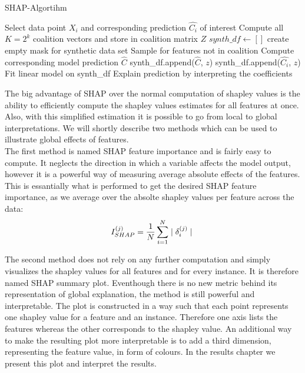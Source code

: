 \documentclass[12pt,titlepage]{article}
\begin{document}
\begin{algorithm}
\caption{SHAP-Algortihm}\label{alg:shap}
\begin{algorithmic}
    \State Select data point $X_{i}$ and corresponding prediction $\hat{C_{i}}$ of interest
    \State Compute all $K = 2^k$ coalition vectors and store in coalition matrix $Z$
    \State $synth\_df \gets []$ create empty mask for synthetic data set
                \State Sample for features not in coalition
                \State Compute corresponding model prediction $\hat{C}$
                \State synth\_df.append($\hat{C}$, $z$)
            \EndFor
        \Else
            \State synth\_df.append($\hat{C_{i}}$, $z$)
        \EndIf
    \EndFor
    \State Fit linear model on synth\_df
    \State Explain prediction by interpreting the coefficients
\end{algorithmic}
\end{algorithm}

The big advantage of SHAP over the normal computation of shapley values is the ability to efficiently compute the shapley values estimates for all features at once. Also, with this simplified estimation it is possible to go from local to global interpretations. We will shortly describe two methods which can be used to illustrate global effects of features. \\
The first method is named SHAP feature importance and is fairly easy to compute. It neglects the direction in which a variable affects the model output, however it is a powerful way of measuring average absolute effects of the features. This is essantially what is performed to get the desired SHAP feature importance, as we average over the absolte shapley values per feature across the data: \\

\begin{equation} \label{shap_importance}
    I_{SHAP}^{(j)} = \frac{1}{N} \sum_{i=1}^{N} \mid \delta^{(j)}_{i} \mid \\
\end{equation}

The second method does not rely on any further computation and simply visualizes the shapley values for all features and for every instance. It is therefore named SHAP summary plot. Eventhough there is no new metric behind its representation of global explanation, the method is still powerful and interpretable. The plot is constructed in a way such that each point represents one shapley value for a feature and an instance. Therefore one axis lists the features whereas the other corresponds to the shapley value. An additional way to make the resulting plot more interpretable is to add a third dimension, representing the feature value, in form of colours. In the results chapter we present this plot and interpret the results. \\
\end{document}
